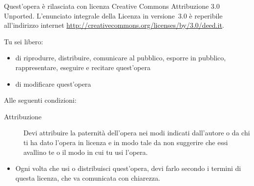 \noindent Quest'opera è rilasciata con licenza Creative Commons Attribuzione 3.0
Unported.  L'enunciato integrale della Licenza in versione~3.0 è reperibile
all'indirizzo internet \url{http://creativecommons.org/licenses/by/3.0/deed.it}.

Tu sei libero:
\begin{itemize}
\item di riprodurre, distribuire, comunicare al pubblico, esporre in pubblico,
  rappresentare, eseguire e recitare quest'opera
\item di modificare quest'opera
\end{itemize}
Alle seguenti condizioni:
\begin{description}
\item[Attribuzione] Devi attribuire la paternità dell'opera nei modi indicati
  dall'autore o da chi ti ha dato l'opera in licenza e in modo tale da non
  suggerire che essi avallino te o il modo in cui tu usi l'opera.
\end{description}

\begin{itemize}
\item Ogni volta che usi o distribuisci quest'opera, devi farlo secondo i
  termini di questa licenza, che va comunicata con chiarezza.
\end{itemize}

